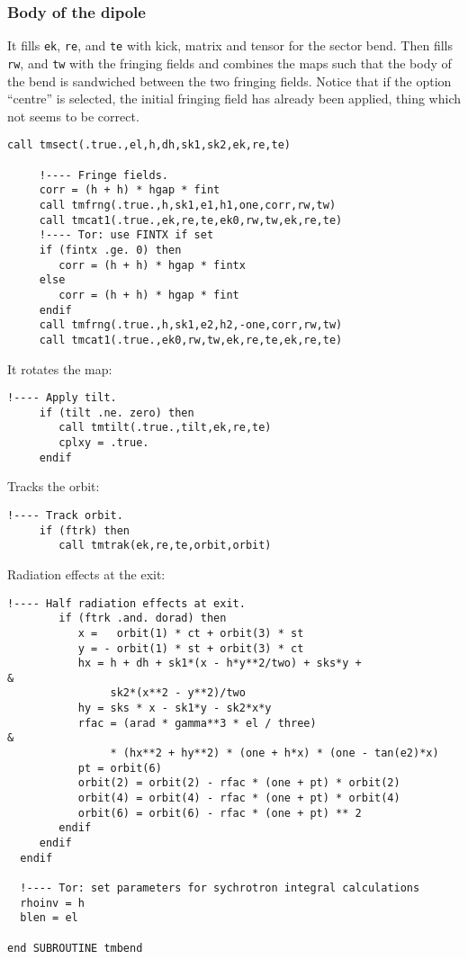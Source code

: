 \documentclass{cern-art} %
\begin{document}
\subsubsection{Body of the dipole}
  It fills  \lstinline[firstnumber=last]{ek},  \lstinline[firstnumber=last]{re}, and \lstinline[firstnumber=last]{te} with kick, matrix and tensor for the sector bend. Then fills  \lstinline[firstnumber=last]{rw}, and \lstinline[firstnumber=last]{tw} with the fringing fields and combines the maps such that the body of the bend is sandwiched between the two fringing fields. Notice that if the option ``centre'' is selected, the initial fringing field has  already been applied, thing which not seems to be correct.  
   \begin{lstlisting}[firstnumber=last]
     call tmsect(.true.,el,h,dh,sk1,sk2,ek,re,te)

     !---- Fringe fields.
     corr = (h + h) * hgap * fint
     call tmfrng(.true.,h,sk1,e1,h1,one,corr,rw,tw)
     call tmcat1(.true.,ek,re,te,ek0,rw,tw,ek,re,te)
     !---- Tor: use FINTX if set
     if (fintx .ge. 0) then
        corr = (h + h) * hgap * fintx
     else
        corr = (h + h) * hgap * fint
     endif
     call tmfrng(.true.,h,sk1,e2,h2,-one,corr,rw,tw)
     call tmcat1(.true.,ek0,rw,tw,ek,re,te,ek,re,te)
\end{lstlisting}
It rotates the map:
\begin{lstlisting}[firstnumber=last]
     !---- Apply tilt.
     if (tilt .ne. zero) then
        call tmtilt(.true.,tilt,ek,re,te)
        cplxy = .true.
     endif
\end{lstlisting}
Tracks the orbit:
\begin{lstlisting}[firstnumber=last]
     !---- Track orbit.
     if (ftrk) then
        call tmtrak(ek,re,te,orbit,orbit)
\end{lstlisting}
Radiation effects at the exit:
\begin{lstlisting}[firstnumber=last]
        !---- Half radiation effects at exit.
        if (ftrk .and. dorad) then
           x =   orbit(1) * ct + orbit(3) * st
           y = - orbit(1) * st + orbit(3) * ct
           hx = h + dh + sk1*(x - h*y**2/two) + sks*y +                &
                sk2*(x**2 - y**2)/two
           hy = sks * x - sk1*y - sk2*x*y
           rfac = (arad * gamma**3 * el / three)                       &
                * (hx**2 + hy**2) * (one + h*x) * (one - tan(e2)*x)
           pt = orbit(6)
           orbit(2) = orbit(2) - rfac * (one + pt) * orbit(2)
           orbit(4) = orbit(4) - rfac * (one + pt) * orbit(4)
           orbit(6) = orbit(6) - rfac * (one + pt) ** 2
        endif
     endif
  endif

  !---- Tor: set parameters for sychrotron integral calculations
  rhoinv = h
  blen = el

end SUBROUTINE tmbend
\end{lstlisting}
\end{document}
